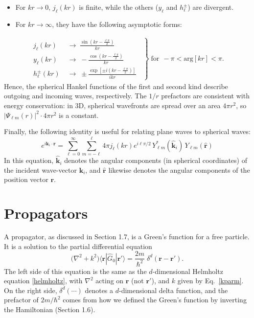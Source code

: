 \documentclass[pra,12pt]{revtex4}
\begin{document}
\begin{itemize}
\item For $kr \rightarrow 0$, $j_\ell(kr)$ is finite, while the others
  ($y_\ell$ and $h_\ell^\pm$) are divergent.

\item For $kr \rightarrow \infty$, they have the following asymptotic forms:
\end{itemize}
\vskip -0.2in
\begin{align}
  \left.
  \begin{aligned}
    j_\ell(kr)\; &\rightarrow \; \frac{\sin(kr-\frac{\ell\pi}{2})}{kr} \\
    y_\ell(kr)\; &\rightarrow \; - \frac{\cos(kr-\frac{\ell\pi}{2})}{kr} \\
    h_\ell^\pm(kr)\; &\rightarrow \; \pm \frac{\exp\left[\pm i(kr-\frac{\ell\pi}{2})\right]}{ikr}
  \end{aligned}\;\;
  \right\}
  \; \text{for}\;\, -\pi < \mathrm{arg}[kr] < \pi.
  \label{sphJasymptote}
\end{align}
Hence, the spherical Hankel functions of the first and second kind
describe outgoing and incoming waves, respectively.  The $1/r$
prefactors are consistent with energy conservation: in 3D, spherical
wavefronts are spread over an area $4\pi r^2$, so $|\Psi_{\ell
  m}(r)|^2 \cdot 4\pi r^2$ is a constant.

Finally, the following identity is useful for relating plane waves to
spherical waves:
\begin{equation}
  e^{i\mathbf{k}_i \cdot \mathbf{r}}
  = \sum_{\ell=0}^\infty \sum_{m=-\ell}^\ell 4 \pi j_{\ell}(kr) e^{i\ell\pi/2} \,
  Y_{\ell m}^*(\hat{\mathbf{k}}_i) \, Y_{\ell m}(\hat{\mathbf{r}})
  \label{plane_wave_decomp}
\end{equation}
In this equation, $\hat{\mathbf{k}}_i$ denotes the angular components
(in spherical coordinates) of the incident wave-vector $\mathbf{k}_i$,
and $\hat{\mathbf{r}}$ likewise denotes the angular components of the
position vector $\mathbf{r}$.

\section{Propagators}
\label{sec:propagator}

A propagator, as discussed in Section 1.7, is a Green's function for a
free particle.  It is a solution to the partial differential equation
\begin{equation}
  \Big(\nabla^2 + k^2\Big) \langle\mathbf{r} |\hat{G}_0 |\mathbf{r}'\rangle
  = \frac{2m}{\hbar^2} \; \delta^d(\mathbf{r}-\mathbf{r}').
\end{equation}
The left side of this equation is the same as the $d$-dimensional
Helmholtz equation \eqref{helmholtz}, with $\nabla^2$ acting on
$\mathbf{r}$ (not $\mathbf{r}'$), and $k$ given by Eq.~\eqref{kparm}.
On the right side, $\delta^d(\cdots)$ denotes a $d$-dimensional delta
function, and the prefactor of $2m/\hbar^2$ comes from how we defined
the Green's function by inverting the Hamiltonian (Section 1.6).
\end{document}

